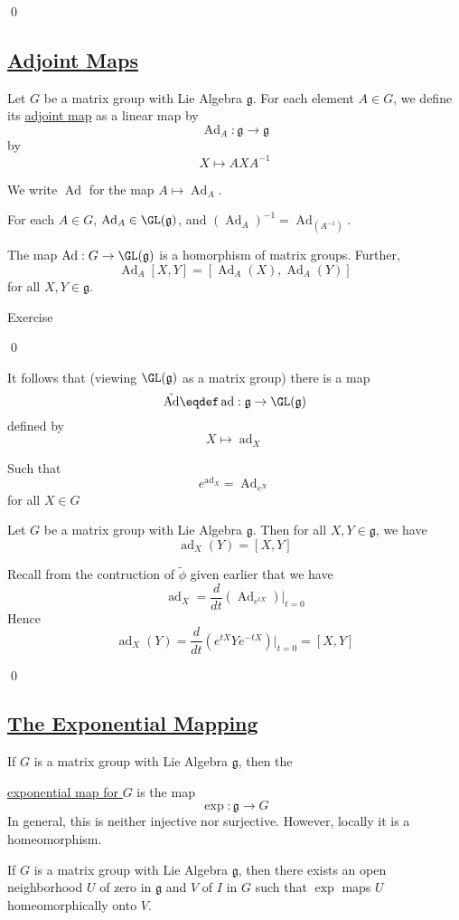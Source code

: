 \documentclass[x11names,reqno,14pt]{extarticle}
\newcommand{\mk}[1]{\mathfrak{#1}}
\newcommand{\g}{\mk{g}}
\newcommand{\tphi}{\tilde{\phi}}
\DeclareMathOperator{\Ad}{Ad}
\DeclareMathOperator{\ad}{ad}
\newcommand{\dd}[2]{\frac{d#1}{d#2}}
\begin{document}
\qed

\subsection*{\underline{Adjoint Maps}}


Let $G$ be a matrix group with Lie Algebra $\g$. For each element $A \in G$, we define its \underline{adjoint map} as a linear map by
\[
\Ad_A:\g\to\g
\]
by
\[
X\mapsto AXA^{-1}
\]

We write $\Ad$ for the map $A \mapsto \Ad_A$. 

\prop

For each $A \in G$, $\Ad_A\in\GL(\g)$, and $(\Ad_A)^{-1} = \Ad_{(A^{-1})}$.

The map $\Ad:G\to\GL(\g)$ is a homorphism of matrix groups. Further, 
\[
\Ad_A[X,Y] = [\Ad_A(X),\Ad_A(Y)]
\]
for all $X, Y \in \g$. 

\proof

Exercise

\qed

It follows that (viewing $\GL(\g)$ as a matrix group) there is a map 
\[
\tilde{\Ad}\eqdef \ad:\g\to\GL(\g)
\]
defined by 
\[
X\mapsto \ad_X
\]

Such that
\[
e^{\ad_X} = \Ad_{e^X}
\]
for all $X \in G$

\prop

Let $G$ be a matrix group with Lie Algebra $\g$. Then for all $X, Y \in \g$, we have
\[
\ad_X(Y) = [X,Y]
\]

\proof

Recall from the contruction of $\tphi$ given earlier that we have
\[
\ad_X = \dd{}{t}(\Ad_{e^{tX}})|_{t=0}
\]
Hence
\[
\ad_X(Y) = \dd{}{t}(e^{tX}Ye^{-tX})|_{t=0} = [X,Y]
\]

\qed

\subsection*{\underline{The Exponential Mapping}}


If $G$ is a matrix group with Lie Algebra $\g$, then the 

\underline{exponential map for $G$} is the map 
\[
\exp:\g\to G
\]
In general, this is neither injective nor surjective. However, locally it is a homeomorphism. 

\thm

If $G$ is a matrix group with Lie Algebra $\g$, then there exists an open neighborhood $U$ of zero in $\g$ and $V$ of $I$ in $G$ such that $\exp$ maps $U$ homeomorphically onto $V$.
\end{document}
